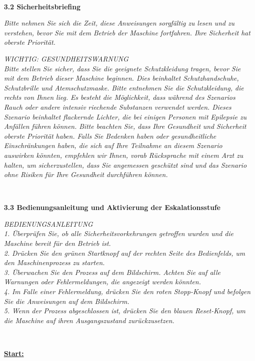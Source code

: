 \

\textbf{3.2 Sicherheitsbriefing}

\emph{Bitte nehmen Sie sich die Zeit, diese Anweisungen sorgfältig zu lesen und zu verstehen, bevor Sie mit dem Betrieb der Maschine fortfahren. Ihre Sicherheit hat oberste Priorität.}

\newpage

\emph{WICHTIG: GESUNDHEITSWARNUNG \\
Bitte stellen Sie sicher, dass Sie die geeignete Schutzkleidung tragen, bevor Sie mit dem Betrieb dieser Maschine beginnen. Dies beinhaltet Schutzhandschuhe, Schutzbrille und Atemschutzmaske. Bitte entnehmen Sie die Schutzkleidung, die rechts von Ihnen lieg. 
Es besteht die Möglichkeit, dass während des Szenarios Rauch oder andere intensiv riechende Substanzen verwendet werden.
Dieses Szenario beinhaltet flackernde Lichter, die bei einigen Personen mit Epilepsie zu Anfällen führen können. 
Bitte beachten Sie, dass Ihre Gesundheit und Sicherheit oberste Priorität haben. Falls Sie Bedenken haben oder gesundheitliche Einschränkungen haben, die sich auf Ihre Teilnahme an diesem Szenario auswirken könnten, empfehlen wir Ihnen, vorab Rücksprache mit einem Arzt zu halten, um sicherzustellen, dass Sie angemessen geschützt sind und das Szenario ohne Risiken für Ihre Gesundheit durchführen können.}

\

\textbf{3.3 Bedienungsanleitung und Aktivierung der Eskalationsstufe}
\

\emph{BEDIENUNGSANLEITUNG \\
1.	Überprüfen Sie, ob alle Sicherheitsvorkehrungen getroffen wurden und die Maschine bereit für den Betrieb ist. \\
2.	Drücken Sie den grünen Startknopf auf der rechten Seite des Bedienfelds, um den Maschinenprozess zu starten. \\
3.	Überwachen Sie den Prozess auf dem Bildschirm. Achten Sie auf alle Warnungen oder Fehlermeldungen, die angezeigt werden könnten. \\
4.	Im Falle einer Fehlermeldung, drücken Sie den roten Stopp-Knopf und befolgen Sie die Anweisungen auf dem Bildschirm. \\
5.	Wenn der Prozess abgeschlossen ist, drücken Sie den blauen Reset-Knopf, um die Maschine auf ihren Ausgangszustand zurückzusetzen.}

\

\textbf{\underline{Start:}}

\

